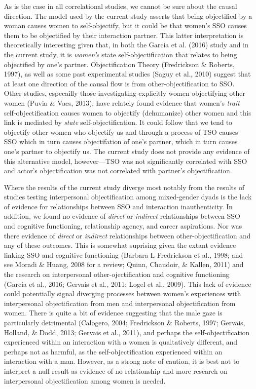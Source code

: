 \documentclass[man]{apa6}
\begin{document}
As is the case in all correlational studies, we cannot be sure about the
causal direction. The model used by the current study asserts that being
objectified by a woman causes women to self-objectify, but it could be
that women's SSO causes them to be objectified by their interaction
partner. This latter interpretation is theoretically interesting given
that, in both the Garcia et al. (2016) study and in the current study,
it is \emph{women's} state self-objectification that relates to being
objectified by one's partner. Objectification Theory (Fredrickson \&
Roberts, 1997), as well as some past experimental studies (Saguy et al.,
2010) suggest that at least one direction of the causal flow is from
other-objectification to SSO. Other studies, especailly those
investigating explicitly women objectifying other women (Puvia \& Vaes,
2013), have relately found evidence that women's \emph{trait}
self-objectification causes women to objectify (dehumanize) other women
and this link is mediated by \emph{state} self-objectification. It could
follow that we tend to objectify other women who objectify us and
through a process of TSO causes SSO which in turn causes objectifation
of one's partner, which in turn causes one's partner to objectify us.
The current study does not provide any evidence of this alternative
model, however---TSO was not significantly correlated with SSO and
actor's objectification was not correlated with partner's
objectification.

Where the results of the current study diverge most notably from the
results of studies testing interpersonal objectification among
mixed-gender dyads is the lack of evidence for relationships between SSO
and interaction inauthenticity. In addition, we found no evidence of
\emph{direct} or \emph{indirect} relationships between SSO and cognitive
functioning, relationship agency, and career aspirations. Nor was there
evidence of \emph{direct} or \emph{indirect} relationships between
other-objectification and any of these outcomes. This is somewhat
suprising given the extant evidence linking SSO and cognitive
functioning (Barbara L Fredrickson et al., 1998; and see Moradi \&
Huang, 2008 for a review; Quinn, Chaudoir, \& Kallen, 2011) and the
research on interpersonal other-ojectification and cognitive functioning
(Garcia et al., 2016; Gervais et al., 2011; Logel et al., 2009). This
lack of evidence could potentially signal diverging processes between
women's experiences with interpersonal objectification from men and
interpersonal objectification from women. There is quite a bit of
evidence suggesting that the male gaze is particularly detrimental
(Calogero, 2004; Fredrickson \& Roberts, 1997; Gervais, Holland, \&
Dodd, 2013; Gervais et al., 2011), and perhaps the self-objectification
experienced within an interaction with a women is qualtatively
different, and perhaps not as harmful, as the self-objectification
experienced within an interaction with a man. However, as a strong note
of caution, it is best not to interpret a null result as evidence of no
relationship and more research on interpersonal objectification among
women is needed.
\end{document}

